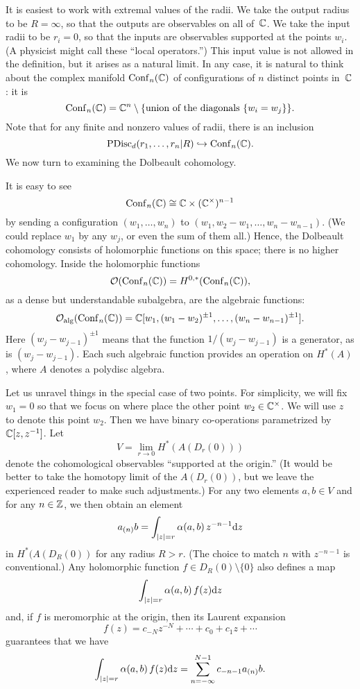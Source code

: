 \documentclass[11pt]{amsart}
\begin{document}
It is easiest to work with extremal values of the radii.
We take the output radius to be $R = \infty$,
so that the outputs are observables on all of~$\mathbb C$.
We take the input radii to be $r_i = 0$,
so that the inputs are observables supported at the points $w_i$.
(A physicist might call these ``local operators.'')
This input value is not allowed in the definition, but it arises as a natural limit.
In any case, it is natural to think about the complex manifold ${\rm Conf}_n(\mathbb C)$ of configurations of $n$ distinct points in~$\mathbb C$:
it is
\[
{\rm Conf}_n(\mathbb C) = \mathbb C^n \setminus \{\text{union of the diagonals $\{ w_i = w_j\}$}\}.
\]
Note that for any finite and nonzero values of radii, there is an inclusion
\[
{\rm PDisc}_d(r_1, \ldots, r_n| R) \hookrightarrow {\rm Conf}_n(\mathbb C).
\]
We now turn to examining the Dolbeault cohomology.

It is easy to see
\[
{\rm Conf}_n(\mathbb C) \cong \mathbb C \times (\mathbb C^\times)^{n-1}
\]
by sending a configuration $(w_1,\ldots, w_n)$ to $(w_1, w_2 - w_1, \ldots, w_n-w_{n-1})$.
(We could replace $w_1$ by any $w_j$, or even the sum of them all.)
Hence, the Dolbeault cohomology consists of holomorphic functions on this space;
there is no higher cohomology.
Inside the holomorphic functions 
\[
\mathcal O({\rm Conf}_n(\mathbb C)) = H^{0,*}({\rm Conf}_n(\mathbb C)),
\] 
as a dense but understandable subalgebra, are the algebraic functions:
\[
\mathcal O_{\rm alg}({\rm Conf}_n(\mathbb C)) = \mathbb C[w_1, (w_1 - w_2)^{\pm 1}, \ldots, (w_n - w_{n-1})^{\pm 1}].
\]
Here $(w_j - w_{j-1})^{\pm 1}$ means that the function $1/(w_j - w_{j-1})$ is a generator, 
as is $(w_j - w_{j-1})$.
Each such algebraic function provides an operation on $H^*(A)$, where $A$ denotes a polydisc algebra.

Let us unravel things in the special case of two points.
For simplicity, we will fix $w_1 = 0$ so that we focus on where place the other point $w_2 \in \mathbb C^\times$.
We will use $z$ to denote this point $w_2$.
Then we have binary co-operations parametrized by $\mathbb C[z, z^{-1}]$.
Let 
\[
V = \lim_{r \to 0} H^*(A(D_r(0)))
\]
denote the cohomological observables ``supported at the origin.''
(It would be better to take the homotopy limit of the $A(D_r(0))$,
but we leave the experienced reader to make such adjustments.)
For any two elements $a, b \in V$ and for any $n \in \mathbb Z$,
we then obtain an element
\[
a_{(n)} b = \int_{|z| = r} \alpha(a,b)\, z^{-n-1} {\rm d} z
\]
in $H^*(A(D_R(0))$ for any radius $R > r$.
(The choice to match $n$ with $z^{-n-1}$ is conventional.)
Any holomorphic function $f \in D_R(0) \setminus \{0\}$ also defines a map
\[
\int_{|z| = r} \alpha(a,b)\, f(z) {\rm d} z 
\]
and, if $f$ is meromorphic at the origin, then its Laurent expansion
\[
f(z) = c_{-N} z^{-N} + \cdots + c_0 + c_1 z + \cdots
\]
guarantees that we have
\[
\int_{|z| = r} \alpha(a,b)\, f(z) {\rm d} z = \sum_{n=-\infty}^{N-1} c_{-n-1} a_{(n)} b.
\]
\end{document}
